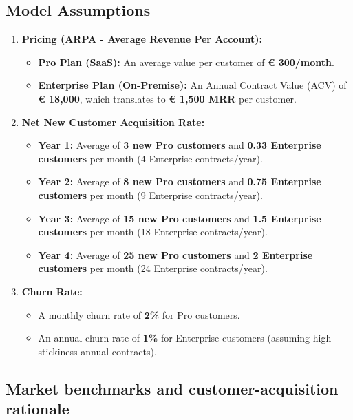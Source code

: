 \documentclass[11pt, a4paper, oneside]{article}
\begin{document}
\subsection{Model Assumptions}
\begin{enumerate}
    \item \textbf{Pricing (ARPA - Average Revenue Per Account):}
    \begin{itemize}
        \item \textbf{Pro Plan (SaaS):} An average value per customer of \textbf{\euro{} 300/month}.
        \item \textbf{Enterprise Plan (On-Premise):} An Annual Contract Value (ACV) of \textbf{\euro{} 18,000}, which translates to \textbf{\euro{} 1,500 MRR} per customer.
    \end{itemize}

    \item \textbf{Net New Customer Acquisition Rate:}
    \begin{itemize}
        \item \textbf{Year 1:} Average of \textbf{3 new Pro customers} and \textbf{0.33 Enterprise customers} per month (4 Enterprise contracts/year).
        \item \textbf{Year 2:} Average of \textbf{8 new Pro customers} and \textbf{0.75 Enterprise customers} per month (9 Enterprise contracts/year).
        \item \textbf{Year 3:} Average of \textbf{15 new Pro customers} and \textbf{1.5 Enterprise customers} per month (18 Enterprise contracts/year).
        \item \textbf{Year 4:} Average of \textbf{25 new Pro customers} and \textbf{2 Enterprise customers} per month (24 Enterprise contracts/year).
    \end{itemize}

    \item \textbf{Churn Rate:}
    \begin{itemize}
        \item A monthly churn rate of \textbf{2\%} for Pro customers.
        \item An annual churn rate of \textbf{1\%} for Enterprise customers (assuming high-stickiness annual contracts).
    \end{itemize}
\end{enumerate}

\subsection{Market benchmarks and customer-acquisition rationale}
\end{document}
